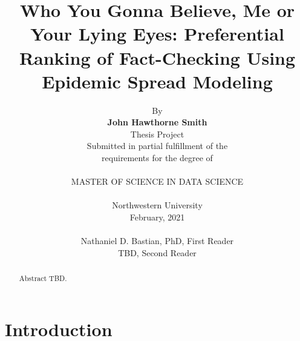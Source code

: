 \documentclass[12pt]{article}
\begin{document}
	
\begin{titlepage}
\title{\textbf{Who You Gonna Believe, Me or Your Lying Eyes: Preferential Ranking of Fact-Checking Using Epidemic Spread Modeling}}

\author{By \\\textbf{John Hawthorne Smith} \\Thesis Project \\Submitted in partial fulfillment of the \\requirements for the degree of \\ \\MASTER OF SCIENCE IN DATA SCIENCE \\ \\Northwestern University \\February, 2021 \\ \\Nathaniel D. Bastian, PhD, First Reader \\TBD, Second Reader}

\date{}
\end{titlepage}

\maketitle
\thispagestyle{empty}
\normalsize


\begin{abstract}
Abstract TBD.
\end{abstract}

\tableofcontents

\section{Introduction}
\label{introduction}
\end{document}
